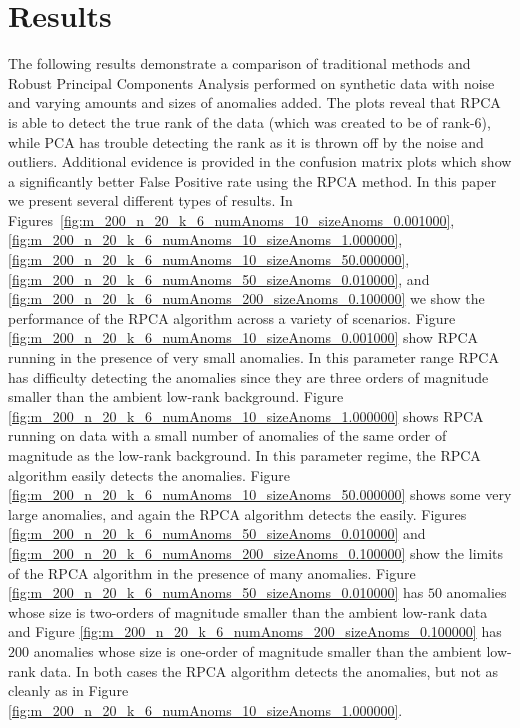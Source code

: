 \documentclass[conference]{IEEEtran}
\begin{document}
\section{Results}
The following results demonstrate a comparison of traditional methods and Robust Principal Components Analysis performed on synthetic data with noise and varying amounts and sizes of anomalies added.  The plots reveal that RPCA is able to detect the true rank of the data (which was created to be of rank-6), while PCA has trouble detecting the rank as it is thrown off by the noise and outliers.  Additional evidence is provided in the confusion matrix plots which show a significantly better False Positive rate using the RPCA method.
In this paper we present several different types of results. 
In Figures~\ref{fig:m_200_n_20_k_6_numAnoms_10_sizeAnoms_0.001000}, \ref{fig:m_200_n_20_k_6_numAnoms_10_sizeAnoms_1.000000}, \ref{fig:m_200_n_20_k_6_numAnoms_10_sizeAnoms_50.000000},
\ref{fig:m_200_n_20_k_6_numAnoms_50_sizeAnoms_0.010000}, and
\ref{fig:m_200_n_20_k_6_numAnoms_200_sizeAnoms_0.100000} we show the performance of the RPCA algorithm across a variety of scenarios. Figure \ref{fig:m_200_n_20_k_6_numAnoms_10_sizeAnoms_0.001000} show RPCA running in the presence of very small anomalies.   In this parameter range RPCA has difficulty detecting the anomalies since they are three orders of magnitude smaller than the ambient low-rank background. 
Figure \ref{fig:m_200_n_20_k_6_numAnoms_10_sizeAnoms_1.000000} shows RPCA running on data with a small number of anomalies of the same order of magnitude as the low-rank background.  In this parameter regime, the RPCA algorithm easily detects the anomalies.  Figure \ref{fig:m_200_n_20_k_6_numAnoms_10_sizeAnoms_50.000000} shows some very large anomalies, and again the RPCA algorithm detects the easily.
Figures \ref{fig:m_200_n_20_k_6_numAnoms_50_sizeAnoms_0.010000} and \ref{fig:m_200_n_20_k_6_numAnoms_200_sizeAnoms_0.100000} show the limits of the RPCA algorithm in the presence of many anomalies.  Figure \ref{fig:m_200_n_20_k_6_numAnoms_50_sizeAnoms_0.010000} has $50$ anomalies whose size is two-orders of magnitude smaller than the ambient low-rank data and Figure \ref{fig:m_200_n_20_k_6_numAnoms_200_sizeAnoms_0.100000} has $200$ anomalies whose size is one-order of magnitude smaller than the ambient low-rank data.  In both cases the RPCA algorithm detects the anomalies, but not as cleanly as in Figure \ref{fig:m_200_n_20_k_6_numAnoms_10_sizeAnoms_1.000000}.
\end{document}
